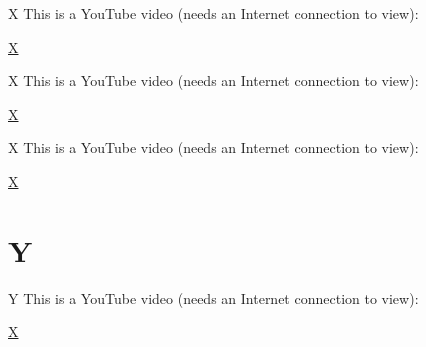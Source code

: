 \documentclass{beamer}
\begin{document}
\begin{frame}{X}
This is a YouTube video (needs an Internet connection to view):

\href{http://www.youtube.com/v/g8Ejj0T0yG4?rel=0}{X}
\end{frame}

\begin{frame}{X}
This is a YouTube video (needs an Internet connection to view):

\href{http://www.youtube.com/v/g8Ejj0T0yG4?rel=0}{X}
\end{frame}

\begin{frame}{X}
This is a YouTube video (needs an Internet connection to view):

\href{http://www.youtube.com/v/g8Ejj0T0yG4?rel=0}{X}
\end{frame}

\section{Y}
\begin{frame}{Y}
This is a YouTube video (needs an Internet connection to view):

\href{http://www.youtube.com/v/g8Ejj0T0yG4?rel=0}{X}
\end{frame}
\end{document}
